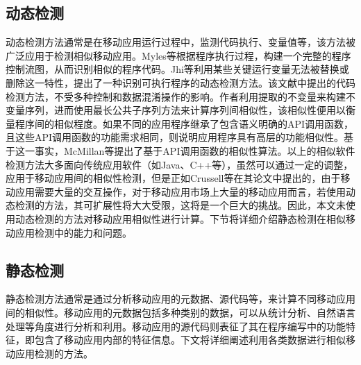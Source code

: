 \subsection{动态检测}
动态检测方法通常是在移动应用运行过程中，监测代码执行、变量值等，该方法被广泛应用于检测相似移动应用。Myles等\cite{myles2004detecting}根据程序执行过程，构建一个完整的程序控制流图，从而识别相似的程序代码。Jhi等\cite{jhi2011value}利用某些关键运行变量无法被替换或删除这一特性，提出了一种识别可执行程序的动态检测方法。该文献中提出的代码检测方法，不受多种控制和数据混淆操作的影响。作者利用提取的不变量来构建不变量序列，进而使用最长公共子序列方法来计算序列间相似性，该相似性便用以衡量程序间的相似程度。如果不同的应用程序继承了包含语义明确的API调用函数，且这些API调用函数的功能需求相同，则说明应用程序具有高层的功能相似性。基于这一事实，McMillan等\cite{mcmillan2012detecting}提出了基于API调用函数的相似性算法。以上的相似软件检测方法大多面向传统应用软件（如Java、C++等），虽然可以通过一定的调整，应用于移动应用间的相似性检测，但是正如Crussell等\cite{crussell2012attack}在其论文中提出的，由于移动应用需要大量的交互操作，对于移动应用市场上大量的移动应用而言，若使用动态检测的方法，其可扩展性将大大受限，这将是一个巨大的挑战。因此，本文未使用动态检测的方法对移动应用相似性进行计算。下节将详细介绍静态检测在相似移动应用检测中的能力和问题。


\subsection{静态检测}
静态检测方法通常是通过分析移动应用的元数据、源代码等，来计算不同移动应用间的相似性。移动应用的元数据包括多种类别的数据，可以从统计分析、自然语言处理等角度进行分析和利用。移动应用的源代码则表征了其在程序编写中的功能特征，即包含了移动应用内部的特征信息。下文将详细阐述利用各类数据进行相似移动应用检测的方法。

